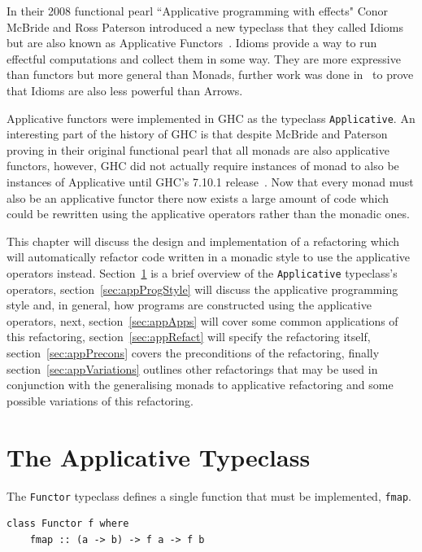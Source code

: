 In their 2008 functional pearl ``Applicative programming with effects" Conor McBride and Ross Paterson introduced a new typeclass that they called Idioms but are also known as Applicative Functors~\citep{mcbrideIdioms}. Idioms provide a way to run effectful computations and collect them in some way. They are more expressive than functors but more general than Monads, further work was done in~\citep{arrowsAndIdioms} to prove that Idioms are also less powerful than Arrows.

Applicative functors were implemented in GHC as the typeclass \texttt{Applicative}. An interesting part of the history of GHC is that despite McBride and Paterson proving in their original functional pearl that all monads are also applicative functors, however,  GHC did not actually require instances of monad to also be instances of Applicative until GHC's 7.10.1 release~\citep{ghc7.10Release}. Now that every monad must also be an applicative functor there now exists a large amount of code which could be rewritten using the applicative operators rather than the monadic ones. 

This chapter will discuss the design and implementation of a refactoring which will automatically refactor code written in a monadic style to use the applicative operators instead. Section~\ref{sec:appOverview} is a brief overview of the \texttt{Applicative} typeclass's operators, section~\ref{sec:appProgStyle} will discuss the applicative programming style and, in general, how programs are constructed using the applicative operators, next, section~\ref{sec:appApps} will cover some common applications of this refactoring, section~\ref{sec:appRefact} will specify the refactoring itself, section~\ref{sec:appPrecons} covers the preconditions of the refactoring, finally section~\ref{sec:appVariations} outlines other refactorings that may be used in conjunction with the generalising monads to applicative refactoring and some possible variations of this refactoring. 

\section{The Applicative Typeclass}
\label{sec:appOverview}

The \texttt{Functor} typeclass defines a single function that must be implemented, \texttt{fmap}.

\begin{lstlisting}[frame=tblr]
class Functor f where
	fmap :: (a -> b) -> f a -> f b
\end{lstlisting}

